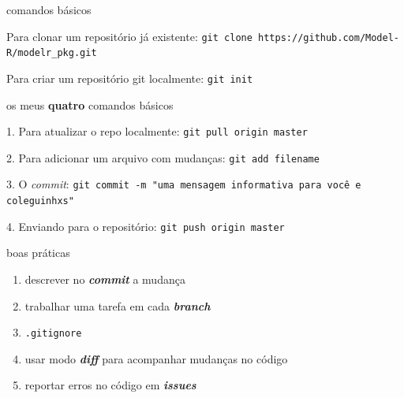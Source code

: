 \documentclass[11pt]{beamer}
\newcommand{\code}{\texttt}
\begin{document}
\begin{frame}{comandos básicos}

     \begin{block}{Para clonar um repositório já existente: }
      \code{git clone https://github.com/Model-R/modelr\_pkg.git}
      \end{block}
   \begin{block}{Para criar um repositório git localmente: }
         \code{git init}
        \end{block}



\end{frame}


\begin{frame}{os meus \textbf{quatro} comandos básicos}

     \begin{block}{1. Para atualizar o repo localmente: }
      \code{git pull origin master}
      \end{block}

   \begin{block}{2. Para adicionar um arquivo com mudanças:}
         \code{git add filename}
        \end{block}
        
          \begin{block}{3. O \textit{commit}:}
         \code{git commit -m "uma mensagem informativa para você e coleguinhxs"}
        \end{block}

     \begin{block}{4. Enviando para o repositório:}
         \code{git push origin master}
        \end{block}


\end{frame}

\begin{frame}{boas práticas}

\begin{enumerate}

\pause \item descrever no \textbf{\textit{commit}} a mudança

\pause \item trabalhar uma tarefa em cada \textbf{\textit{branch}}

\pause \item \code{.gitignore}

\pause \item usar modo \textit{\textbf{diff}} para acompanhar mudanças no código

\pause \item reportar erros no código em \textbf{\textit{issues}}

\end{enumerate}

\end{frame}
\end{document}
